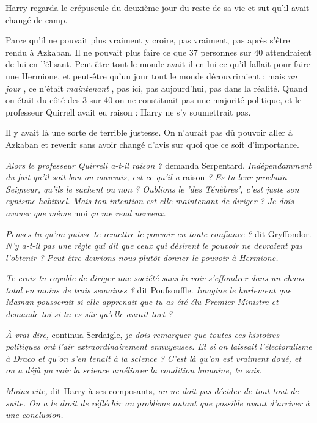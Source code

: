 Harry regarda le crépuscule du deuxième jour du reste de sa vie et sut qu'il avait changé de camp.

Parce qu'il ne pouvait plus vraiment y croire, pas vraiment, pas après s'être rendu à Azkaban. Il ne pouvait plus faire ce que 37 personnes sur 40 attendraient de lui en l'élisant. Peut-être tout le monde avait-il en lui ce qu'il fallait pour faire une Hermione, et peut-être qu'un jour tout le monde découvriraient ; mais \emph{un jour} , ce n'était \emph{maintenant} , pas ici, pas aujourd'hui, pas dans la réalité. Quand on était du côté des 3 sur 40 on ne constituait pas une majorité politique, et le professeur Quirrell avait eu raison : Harry ne s'y soumettrait pas.

Il y avait là une sorte de terrible justesse. On n'aurait pas dû pouvoir aller à Azkaban et revenir sans avoir changé d'avis sur quoi que ce soit d'importance.

\emph{Alors le professeur Quirrell a-t-il raison ?}  demanda Serpentard. \emph{Indépendamment du fait qu'il soit bon ou mauvais, est-ce qu'il a } raison \emph{? Es-tu leur prochain Seigneur, qu'ils le sachent ou non ? Oublions le 'des Ténèbres', c'est juste son cynisme habituel. Mais ton intention est-elle maintenant de diriger ? Je dois avouer que même } moi\emph{ ça me rend nerveux.} 

\emph{Penses-tu qu'on puisse te remettre le pouvoir en toute confiance ? } dit Gryffondor. \emph{N'y a-t-il pas une règle qui dit que ceux qui désirent le pouvoir ne devraient pas l'obtenir ? Peut-être devrions-nous plutôt donner le pouvoir à Hermione.} 

\emph{Te crois-tu capable de diriger une société sans la voir s'effondrer dans un chaos total en moins de trois semaines ? } dit Poufsouffle. \emph{Imagine le hurlement que Maman pousserait si elle apprenait que tu as été élu Premier Ministre et demande-toi si tu es sûr qu'elle aurait tort ?} 

\emph{À vrai dire, } continua Serdaigle, \emph{je dois remarquer que toutes ces histoires politiques ont l'air extraordinairement ennuyeuses. Et si on laissait l'électoralisme à Draco et qu'on s'en tenait à la science ? C'est là qu'on est vraiment doué, et on a déjà pu voir la science améliorer la condition humaine, tu sais.} 

\emph{Moins vite,}  dit Harry à ses composants\emph{, on ne doit pas décider de tout tout de suite. On a le droit de réfléchir au problème autant que possible avant d'arriver à une conclusion.} 

